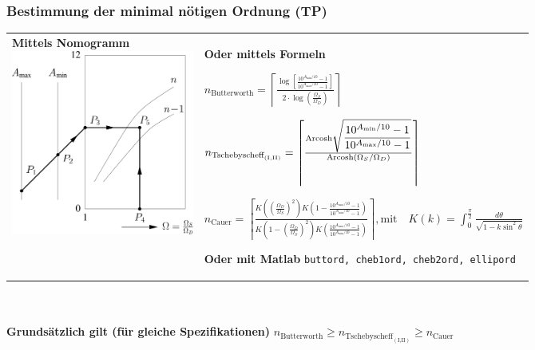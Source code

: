 \subsubsection{Bestimmung der minimal nötigen Ordnung (TP)}
\label{ordnung}
\begin{tabular}{p{7cm} p{11cm}}
\parbox{6cm}{
	\textbf{Mittels Nomogramm} \\
	\includegraphics[width=6cm]{./images/filter-nomogramme.png}
	}
& \parbox{12cm}{
	\textbf{Oder mittels Formeln}\\
    
  $n_{\text{Butterworth}} = \left\lceil\frac{\log{\left[\displaystyle\frac{10^{A_{\min}/10}-1}
  {10^{A_{\max}/10}-1}\right]}} {2 \cdot \log{\left(\frac{\Omega_{S}}{\Omega_{D}}\right)}}\right\rceil$
   \\ \\
    
  $n_{\text{Tschebyscheff}_{(\text{I,II})}} = \left\lceil\frac{{\rm Arcosh}
  \sqrt{\displaystyle\frac{10^{A_{\min}/10}-1}{10^{A_{\max}/10}-1}}}
  {{\rm Arcosh}\left({\Omega_{S}/\Omega_{D}}\right)} \right\rceil$
   \\ \\
    
  $n_{\text{Cauer}} = \left\lceil\frac{K\left(\left( \frac{\Omega_D}{\Omega_S}\right)^2\right)
  K\left(1-\frac{10^{A_{\max}/10}-1}{10^{A_{\min}/10}-1}\right) } {K\left(1-\left(\frac{\Omega_D}
  {\Omega_S}\right)^2\right )K\left(\frac{10^{A_{\max}/10}-1}{10^{A_{\min}/10}-1} \right)}\right\rceil,
  \text{mit}\quad
  K(k)=\int_0^{\frac{\pi}{2}}\frac{d\theta}{\sqrt{1-k\sin^2\theta}}$
  \\ \\

	\textbf{Oder mit Matlab}\\
	\texttt{buttord, cheb1ord, cheb2ord, ellipord}	
	}
\end{tabular} \\ \\
\textbf{Grundsätzlich gilt (für gleiche Spezifikationen)} \quad
$n_{\text{Butterworth}}\geq n_{\text{Tschebyscheff}_{(\text{I,II})}}\geq n_{\text{Cauer}}$

